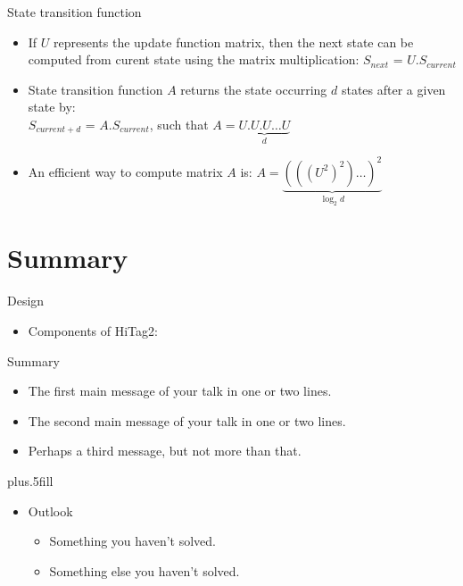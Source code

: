 \documentclass{beamer}
\begin{document}
\begin{frame}{State transition function}
\small{
\begin{itemize}
	\item If $U$ represents the update function matrix, then the next state can be computed from curent state using the matrix multiplication: $S_{next}$ = $U . S_{current}$
	\item State transition function $A$ returns the state occurring $d$ states after a given state by:\\
	$S_{current + d}$ = $A . S_{current}$, such that $A = \underbrace{U . U . U \dots U}_{d}$
	\item An efficient way to compute matrix $A$ is: $A = \underbrace{(((U^2)^2) \dotsc )^2}_{\log_2{d}}$
	
\end{itemize}
}
\end{frame}

\section*{Summary}

\begin{frame}{Design}
\begin{itemize}
	\item Components of HiTag2:
\end{itemize}
\end{frame}

\begin{frame}{Summary}

  \begin{itemize}
  \item
    The \alert{first main message} of your talk in one or two lines.
  \item
    The \alert{second main message} of your talk in one or two lines.
  \item
    Perhaps a \alert{third message}, but not more than that.
  \end{itemize}
  
  \vskip0pt plus.5fill
  \begin{itemize}
  \item
    Outlook
    \begin{itemize}
    \item
      Something you haven't solved.
    \item
      Something else you haven't solved.
    \end{itemize}
  \end{itemize}
\end{frame}
\end{document}
